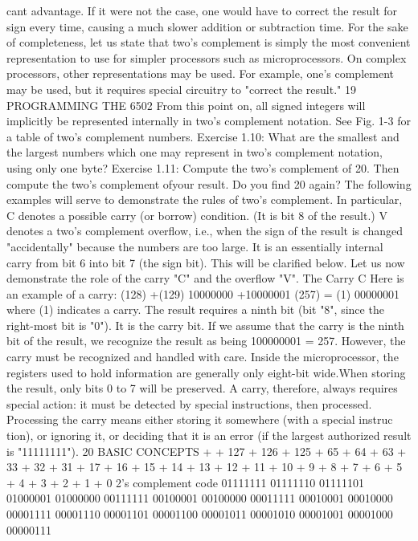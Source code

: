 \documentclass{book}
\begin{document}
cant advantage. If it were not the case, one would have to correct the
result for sign every time, causing a much slower addition or subtraction
time.
For the sake of completeness, let us state that two's complement is
simply the most convenient representation to use for simpler processors
such as microprocessors. On complex processors, other representations
may be used. For example, one's complement may be used, but it requires
special circuitry to "correct the result."
19
PROGRAMMING THE 6502
From this point on, all signed integers will implicitly be represented
internally in two's complement notation. See Fig. 1-3 for a table of
two's complement numbers.
Exercise 1.10: What are the smallest and the largest numbers which one
may represent in two's complement notation, using only one byte?
Exercise 1.11: Compute the two's complement of 20. Then compute the
two's complement ofyour result. Do you find 20 again?
The following examples will serve to demonstrate the rules of two's
complement. In particular, C denotes a possible carry (or borrow)
condition. (It is bit 8 of the result.)
V denotes a two's complement overflow, i.e., when the sign of the
result is changed "accidentally" because the numbers are too
large. It is an essentially internal carry from bit 6 into bit 7 (the
sign bit). This will be clarified below.
Let us now demonstrate the role of the carry "C" and the overflow
"V".
The Carry C
Here is an example of a carry:
(128)
+(129)
10000000
+10000001
(257) = (1) 00000001
where (1) indicates a carry.
The result requires a ninth bit (bit "8", since the right-most bit is
"0"). It is the carry bit.
If we assume that the carry is the ninth bit of the result, we
recognize the result as being 100000001 = 257.
However, the carry must be recognized and handled with care.
Inside the microprocessor, the registers used to hold information
are generally only eight-bit wide.When storing the result, only bits 0 to
7 will be preserved.
A carry, therefore, always requires special action: it must be
detected by special instructions, then processed. Processing the
carry means either storing it somewhere (with a special instruc
tion), or ignoring it, or deciding that it is an error (if the largest
authorized result is "11111111").
20
BASIC CONCEPTS
+
+ 127
+ 126
+ 125
+ 65
+ 64
+ 63
+ 33
+ 32
+ 31
+ 17
+ 16
+ 15
+ 14
+ 13
+ 12
+ 11
+ 10
+ 9
+ 8
+ 7
+ 6
+ 5
+ 4
+ 3
+ 2
+ 1
+ 0
2's complement
code
01111111
01111110
01111101
01000001
01000000
00111111
00100001
00100000
00011111
00010001
00010000
00001111
00001110
00001101
00001100
00001011
00001010
00001001
00001000
00000111
\end{document}
